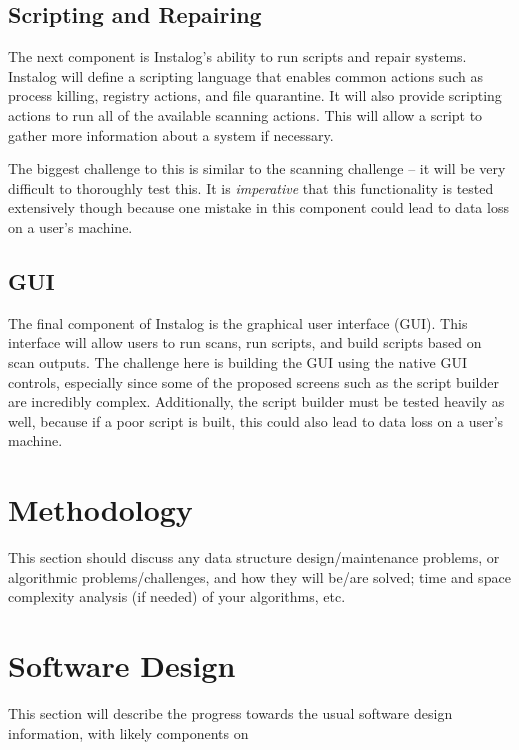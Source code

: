 \documentclass[letterpaper,12pt]{article}
\begin{document}
\subsection{Scripting and Repairing}
The next component is Instalog's ability to run scripts and repair systems. 
Instalog will define a scripting language that enables common actions such as
process killing, registry actions, and file quarantine.  It will also provide
scripting actions to run all of the available scanning actions.  This will allow
a script to gather more information about a system if necessary.  

The biggest challenge to this is similar to the scanning challenge -- it will be
very difficult to thoroughly test this.  It is \textit{imperative} that this
functionality is tested extensively though because one mistake in this component
could lead to data loss on a user's machine.  

\subsection{GUI}
The final component of Instalog is the graphical user interface (GUI).  This
interface will allow users to run scans, run scripts, and build scripts based on
scan outputs.  The challenge here is building the GUI using the native GUI
controls, especially since some of the proposed screens such as the script
builder are incredibly complex.  Additionally, the script builder must be tested
heavily as well, because if a poor script is built, this could also lead to data
loss on a user's machine.  

\newpage



\section{Methodology}
This section should discuss any data structure design/maintenance problems, or
algorithmic problems/challenges, and how they will be/are solved; time and space
complexity analysis (if needed) of your algorithms, etc.

\newpage



\section{Software Design}
This section will describe the progress towards the usual software design
information, with likely components on
\end{document}

